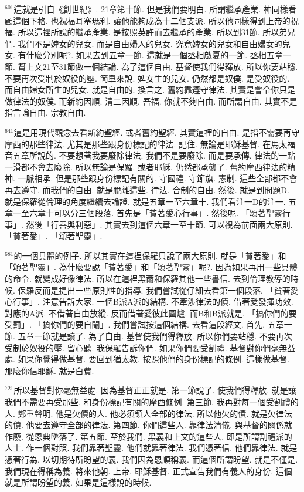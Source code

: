 \documentclass{book}
\begin{document}
$^{601}$這就是引自《創世紀》.
21章第十節.
但是我們要明白.
所謂繼承產業.
神同樣看顧這個下格.
也祝福耳塞瑪利.
讓他能夠成為十二個支派.
所以他同樣得到上帝的祝福.
所以這裡所說的繼承產業.
是按照英許而去繼承的產業.
所以到31節.
所以弟兄們.
我們不是婢女的兒女.
而是自由婦人的兒女.
究竟婢女的兒女和自由婦女的兒女.
有什麼分別呢?.
如果去到五章一節.
這就是一個丞相啟夏的一節.
丞相五章一節.
幫上文21至31節做一個結論.
為了這個自由.
基督使我們得釋放.
所以你要站穩.
不要再次受制於奴役的壓.
簡單來說.
婢女生的兒女.
仍然都是奴僕.
是受奴役的.
而自由婦女所生的兒女.
就是自由的.
換言之.
舊約靠遵守律法.
其實是會令你只是做律法的奴僕.
而新約因順.
清二因順.
吾福.
你就不夠自由.
而所謂自由.
其實不是指言論自由.
宗教自由.

$^{641}$這是用現代觀念去看新約聖經.
或者舊約聖經.
其實這裡的自由.
是指不需要再守摩西的那些律法.
尤其是那些跟身份標記的律法.
記住.
無論是耶穌基督.
在馬太福音五章所說的.
不要想著我要廢除律法.
我們不是要廢除.
而是要承傳.
律法的一點一滑都不會去廢除.
所以無論是保羅.
或者耶穌.
仍然都承襲了.
舊約摩西律法的精神.
一脈相承.
但是那些跟身份標記有關的.
守國禮.
守節旗.
憲制.
這些全部都不會再去遵守.
而我們的自由.
就是脫離這些.
律法.
合制的自由.
然後.
就是到問題D.
就是保羅從倫理的角度繼續去論證.
就是五章一至六章十.
我們看注一D的注一.
五章一至六章十可以分三個段落.
首先是「貧著愛心行事」.
然後呢.
「頌著聖靈行事」.
然後「行善與利惡」.
其實去到這個六章一至十節.
可以視為前面兩大原則.
「貧著愛」.
「頌著聖靈」.

$^{681}$的一個具體的例子.
所以其實在這裡保羅只說了兩大原則.
就是「貧著愛」和「頌著聖靈」.
為什麼要說「貧著愛」和「頌著聖靈」呢?.
因為如果再用一些具體的命令.
就變成好像律法.
所以在這裡黑爾和保羅其他一些書信.
去到倫理教導的時候.
保羅反而是提出一些原則性的指導.
我們嘗試從仔細去看第一個段落.
「貧著愛心行事」.
注意告訴大家.
一個B派A派的結構.
不牽涉律法的債.
借著愛發揮功效.
對應的A派.
不借著自由放縱.
反而借著愛彼此圍爐.
而B和B派就是.
「搞你們的要受罰」.
「搞你們的要自閹」.
我們嘗試按這個結構.
去看這段經文.
首先.
五章一節.
五章一節就是讀了.
為了自由.
基督使我們得釋放.
所以你們要站穩.
不要再次受制於奴役的壓.
留心聽.
我保羅告訴你們.
如果你們要受割禮.
基督對你們毫無益處.
如果你覺得做基督.
要回到猶太教.
按照他們的身份標記的條例.
這樣做基督.
那麼你信耶穌.
就是白費.

$^{721}$所以基督對你毫無益處.
因為基督正正就是.
第一節說了.
使我們得釋放.
就是讓我們不需要再受那些.
和身份標記有關的摩西條例.
第三節.
我再對每一個受割禮的人.
鄭重聲明.
他是欠債的人.
他必須領人全部的律法.
所以他欠的債.
就是欠律法的債.
他要去遵守全部的律法.
第四節.
你們這些人.
靠律法清儀.
與基督的關係就作廢.
從恩典墜落了.
第五節.
至於我們.
黑義和上文的這些人.
即是所謂割禮派的人士.
作一個對照.
我們靠著聖靈.
他們就靠著律法.
我們憑著信.
他們靠律法.
就是憑著行為.
以切期待所盼望的義.
我們因為恩順稱義.
而這個所謂盼望.
就是不僅是.
我們現在得稱為義.
將來他朝.
上帝.
耶穌基督.
正式宣告我們有義人的身份.
這個就是所謂盼望的義.
如果是這樣說的時候.
\end{document}
